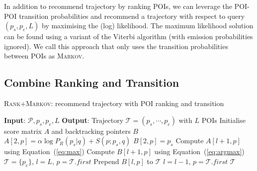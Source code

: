 In addition to recommend trajectory by ranking POIs, we can leverage the POI-POI transition probabilities and 
recommend a trajectory with respect to query $(p_s, p_e, L)$ by maximising the (log) likelihood. 
The maximum likelihood solution can be found using a variant of the Viterbi algorithm (with emission probabilities ignored).
We call this approach that only uses the transition probabilities between POIs as \textsc{Markov}.




\subsection{Combine Ranking and Transition}
\label{sec:rank+markov}

\begin{algorithm}[t]
\caption{\textsc{Rank+Markov}: recommend trajectory with POI ranking and transition}
\label{alg:rank+markov}
\begin{algorithmic}[1]
\STATE \textbf{Input}: $\mathcal{P}, p_s, p_e, L$
\STATE \textbf{Output}: Trajectory $\mathcal{T} = (p_s, \cdots, p_e)$ with $L$ POIs
\STATE Initialise score matrix $A$ and backtracking pointers $B$
    \STATE $A[2, p] = \alpha \log P_R(p_s|q) + S(p; p_s, q)$
    \STATE $B[2, p] = p_s$
\ENDFOR
{}
        \STATE Compute $A[l+1, p]$ using Equation~(\ref{eq:max})
        \STATE Compute $B[l+1, p]$ using Equation~(\ref{eq:argmax})
    \ENDFOR
\ENDFOR
\STATE $\mathcal{T}= \{p_e\}$, $l = L$, $p = \mathcal{T}.first$
\REPEAT
    \STATE Prepend $B[l, p]$ to $\mathcal{T}$
    \STATE $l = l - 1$, $p = \mathcal{T}.first$
\RETURN $\mathcal{T}$
\end{algorithmic}
\end{algorithm}






